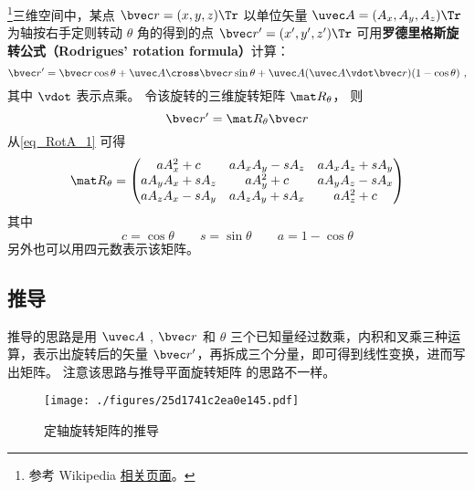 

\footnote{参考 Wikipedia \href{https://en.wikipedia.org/wiki/Rodrigues'_rotation_formula}{相关页面}。}三维空间中，某点 $\bvec r=(x,y,z)\Tr$ 以单位矢量 $\uvec A=(A_x, A_y, A_z)\Tr$ 为轴按右手定则转动 $\theta$ 角的得到的点 $\bvec r'=(x',y',z')\Tr$ 可用\textbf{罗德里格斯旋转公式（Rodrigues' rotation formula）}计算：
\begin{equation}\label{eq_RotA_1}
\bvec r' = \bvec r \cos\theta + \uvec A \cross \bvec r \sin\theta + \uvec A (\uvec A \vdot \bvec r) (1 - \cos\theta)~,
\end{equation}
其中 $\vdot$ 表示点乘。 令该旋转的三维旋转矩阵 $\mat R_\theta$， 则
\begin{equation}\label{eq_RotA_2}
\bvec r' = \mat R_\theta \bvec r
\end{equation}
从\autoref{eq_RotA_1} 可得
\begin{equation}\label{eq_RotA_3}
\mat R_\theta =
\begin{pmatrix}
a A_x^2 + c & a A_x A_y - s A_z & a A_x A_z + s A_y\\
a A_y A_x + s A_z & a A_y^2 + c & a A_y A_z - s A_x\\
a A_z A_x - s A_y & a A_z A_y + s A_x & a A_z^2 + c
\end{pmatrix}\end{equation}
其中
\begin{equation}
c = \cos\theta \qquad s = \sin\theta \qquad a = 1 - \cos\theta
\end{equation}
另外也可以用四元数表示该矩阵。

\subsection{推导}
推导的思路是用 $\uvec A$ , $\bvec r$ 和 $\theta $ 三个已知量经过数乘，内积和叉乘三种运算，表示出旋转后的矢量 $\bvec r'$，再拆成三个分量，即可得到线性变换，进而写出矩阵。 注意该思路与推导平面旋转矩阵 的思路不一样。
\begin{figure}[ht]
\centering
\texttt{[image: ./figures/25d1741c2ea0e145.pdf]}
\caption{定轴旋转矩阵的推导} \label{fig_RotA_1}
\end{figure} 

